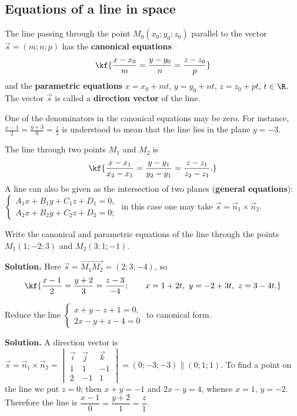
\subsection{Equations of a line in space}

\begin{tarif}
The line passing through the point $M_0(x_0;y_0;z_0)$ parallel to the vector
$\vec s=(m;n;p)$ has the \textbf{canonical equations}
\[\kf{\frac{x-x_0}{m}=\frac{y-y_0}{n}=\frac{z-z_0}{p}}\]
and the \textbf{parametric equations} $x=x_0+mt$, $y=y_0+nt$, $z=z_0+pt$,
$t\in\R$. The vector $\vec s$ is called a \textbf{direction vector} of the line.
\end{tarif}

\begin{eslatma}
One of the denominators in the canonical equations may be zero. For instance,
$\frac{x-1}{2}=\frac{y+3}{0}=\frac{z}{5}$ is understood to mean that the line
lies in the plane $y=-3$.
\end{eslatma}

The line through two points $M_1$ and $M_2$ is
\[\kf{\frac{x-x_1}{x_2-x_1}=\frac{y-y_1}{y_2-y_1}=\frac{z-z_1}{z_2-z_1}.}\]
A line can also be given as the intersection of two planes (\textbf{general
equations}):
$\begin{cases}A_1x+B_1y+C_1z+D_1=0,\\A_2x+B_2y+C_2z+D_2=0;\end{cases}$
in this case one may take $\vec s=\vec n_1\times\vec n_2$.

\begin{misol}
Write the canonical and parametric equations of the line through the points
$M_1(1;-2;3)$ and $M_2(3;1;-1)$.

\textbf{Solution.} Here $\vec s=\overrightarrow{M_1M_2}=(2;3;-4)$, so
\[\kf{\frac{x-1}{2}=\frac{y+2}{3}=\frac{z-3}{-4};\qquad
x=1+2t,\ y=-2+3t,\ z=3-4t.}\]
\end{misol}

\begin{misol}
Reduce the line
$\begin{cases}x+y-z+1=0,\\2x-y+z-4=0\end{cases}$ to canonical form.

\textbf{Solution.} A direction vector is $\vec s=\vec n_1\times\vec n_2=
\begin{vmatrix}\vec i&\vec j&\vec k\\1&1&-1\\2&-1&1\end{vmatrix}=(0;-3;-3)\parallel(0;1;1)$.
To find a point on the line we put $z=0$; then $x+y=-1$ and $2x-y=4$, whence
$x=1$, $y=-2$. Therefore the line is $\dfrac{x-1}{0}=\dfrac{y+2}{1}=\dfrac{z}{1}$.
\end{misol}

